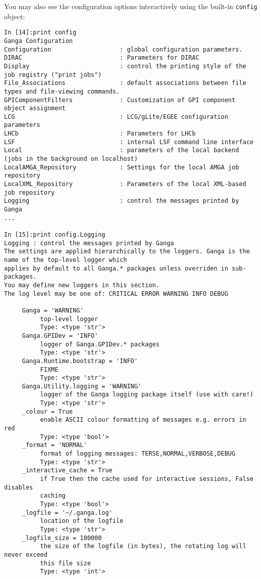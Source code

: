 \documentclass{howto}
\begin{document}
You may also see the configuration options interactively using the built-in \texttt{config} object:

\begin{verbatim}
In [14]:print config
Ganga Configuration
Configuration                   : global configuration parameters.
DIRAC                           : Parameters for DIRAC
Display                         : control the printing style of the job registry ("print jobs")
File_Associations               : default associations between file types and file-viewing commands.
GPIComponentFilters             : Customization of GPI component object assignment
LCG                             : LCG/gLite/EGEE configuration parameters
LHCb                            : Parameters for LHCb
LSF                             : internal LSF command line interface
Local                           : parameters of the local backend (jobs in the background on localhost)
LocalAMGA_Repository            : Settings for the local AMGA job repository
LocalXML_Repository             : Parameters of the local XML-based job repository
Logging                         : control the messages printed by Ganga
...

In [15]:print config.Logging
Logging : control the messages printed by Ganga
The settings are applied hierarchically to the loggers. Ganga is the name of the top-level logger which
applies by default to all Ganga.* packages unless overriden in sub-packages.
You may define new loggers in this section.
The log level may be one of: CRITICAL ERROR WARNING INFO DEBUG

     Ganga = 'WARNING'
          top-level logger
          Type: <type 'str'>
     Ganga.GPIDev = 'INFO'
          logger of Ganga.GPIDev.* packages
          Type: <type 'str'>
     Ganga.Runtime.bootstrap = 'INFO'
          FIXME
          Type: <type 'str'>
     Ganga.Utility.logging = 'WARNING'
          logger of the Ganga logging package itself (use with care!)
          Type: <type 'str'>
     _colour = True
          enable ASCII colour formatting of messages e.g. errors in red
          Type: <type 'bool'>
     _format = 'NORMAL'
          format of logging messages: TERSE,NORMAL,VERBOSE,DEBUG
          Type: <type 'str'>
     _interactive_cache = True
          if True then the cache used for interactive sessions, False disables
          caching
          Type: <type 'bool'>
     _logfile = '~/.ganga.log'
          location of the logfile
          Type: <type 'str'>
     _logfile_size = 100000
          the size of the logfile (in bytes), the rotating log will never exceed
          this file size
          Type: <type 'int'>
\end{verbatim}
\end{document}
